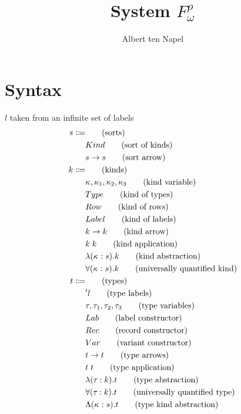 \documentclass[12pt]{article}
\title{System $F^{\rho}_{\omega}$}
\author{Albert ten Napel}
\date{}
\newcommand\llabel[0]{l} %
\newcommand\sort[0]{s} %
\newcommand\skind[0]{\mathnormal{Kind}} %
\newcommand\sarr[2]{#1 \rightarrow #2} %
\newcommand\kind[0]{k} %
\newcommand\kvar[1]{\kappa_{#1}} %
\newcommand\ktype[0]{\mathnormal{Type}} %
\newcommand\krow[0]{\mathnormal{Row}} %
\newcommand\klabel[0]{\mathnormal{Label}} %
\newcommand\karr[2]{#1 \rightarrow #2} %
\newcommand\kapp[2]{#1 \; #2} %
\newcommand\kabs[3]{\lambda(#1 : #2) . #3} %
\newcommand\kforall[3]{\forall(#1 : #2) . #3} %
\newcommand\type[0]{t} %
\newcommand\tlabel[1]{'#1} %
\newcommand\tvar[1]{\tau_{#1}} %
\newcommand\tlab[0]{\mathnormal{Lab}} %
\newcommand\trecord[0]{\mathnormal{Rec}} %
\newcommand\tvariant[0]{\mathnormal{Var}} %
\newcommand\tarr[2]{#1 \rightarrow #2} %
\newcommand\tapp[2]{#1 \; #2} %
\newcommand\tabs[3]{\lambda(#1 : #2) . #3} %
\newcommand\tforall[3]{\forall(#1 : #2) . #3} %
\newcommand\tkabs[3]{\Lambda(#1 : #2) . #3} %
\begin{document}
\maketitle

\section{Syntax}
$\llabel$ taken from an infinite set of labels
\begin{align}
	\sort \Coloneqq 	& 							\tag{sorts} \\
				& \skind						\tag{sort of kinds} \\
				& \sarr{\sort}{\sort}				\tag{sort arrow} \\
	\kind \Coloneqq	&							\tag{kinds} \\
				& \kvar{}, \kvar{1}, \kvar{2}, \kvar{3}		\tag{kind variable} \\
				& \ktype						\tag{kind of types} \\
				& \krow						\tag{kind of rows} \\
				& \klabel						\tag{kind of labels} \\
				& \karr{\kind}{\kind}				\tag{kind arrow} \\
				& \kapp{\kind}{\kind}				\tag{kind application} \\
				& \kabs{\kvar{}}{\sort}{\kind}			\tag{kind abstraction} \\
				& \kforall{\kvar{}}{\sort}{\kind}			\tag{universally quantified kind} \\
	\type \Coloneqq	&							\tag{types} \\
				& \tlabel{\llabel}					\tag{type labels} \\
				& \tvar{}, \tvar{1}, \tvar{2}, \tvar{3}		\tag{type variables} \\
				& \tlab						\tag{label constructor} \\
				& \trecord						\tag{record constructor} \\
				& \tvariant						\tag{variant constructor} \\
				& \tarr{\type}{\type}				\tag{type arrows} \\
				& \tapp{\type}{\type}				\tag{type application} \\
				& \tabs{\tvar{}}{\kind}{\type}			\tag{type abstraction} \\
				& \tforall{\tvar{}}{\kind}{\type}			\tag{universally quantified type} \\
				& \tkabs{\kvar{}}{\sort}{\type}			\tag{type kind abstraction} \\

\end{align}
\end{document}
